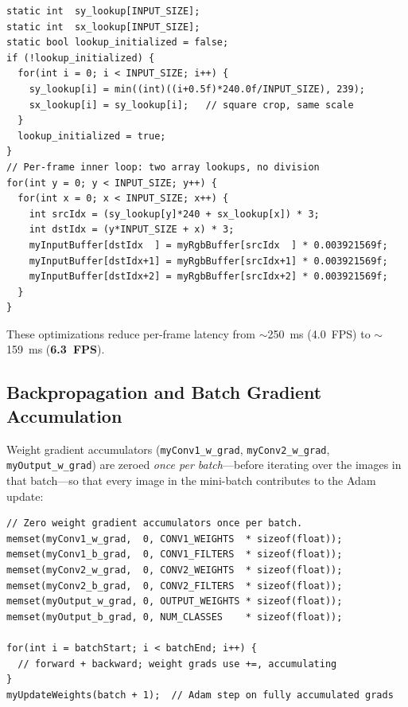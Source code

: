 \documentclass[12pt]{article}
\begin{document}
\begin{lstlisting}[caption={Pre-computed resize lookup tables with multiply-based normalization (Part~3).}]
static int  sy_lookup[INPUT_SIZE];
static int  sx_lookup[INPUT_SIZE];
static bool lookup_initialized = false;
if (!lookup_initialized) {
  for(int i = 0; i < INPUT_SIZE; i++) {
    sy_lookup[i] = min((int)((i+0.5f)*240.0f/INPUT_SIZE), 239);
    sx_lookup[i] = sy_lookup[i];   // square crop, same scale
  }
  lookup_initialized = true;
}
// Per-frame inner loop: two array lookups, no division
for(int y = 0; y < INPUT_SIZE; y++) {
  for(int x = 0; x < INPUT_SIZE; x++) {
    int srcIdx = (sy_lookup[y]*240 + sx_lookup[x]) * 3;
    int dstIdx = (y*INPUT_SIZE + x) * 3;
    myInputBuffer[dstIdx  ] = myRgbBuffer[srcIdx  ] * 0.003921569f;
    myInputBuffer[dstIdx+1] = myRgbBuffer[srcIdx+1] * 0.003921569f;
    myInputBuffer[dstIdx+2] = myRgbBuffer[srcIdx+2] * 0.003921569f;
  }
}
\end{lstlisting}

These optimizations reduce per-frame latency from $\sim$250~ms (4.0~FPS) to
$\sim$159~ms (\textbf{6.3~FPS}).

\subsection{Backpropagation and Batch Gradient Accumulation}
\label{subsec:backprop}

Weight gradient accumulators (\texttt{myConv1\_w\_grad},
\texttt{myConv2\_w\_grad}, \texttt{myOutput\_w\_grad}) are zeroed
\emph{once per batch}---before iterating over the images in that batch---so
that every image in the mini-batch contributes to the Adam update:

\begin{lstlisting}[caption={Batch-level gradient zeroing before Adam update (Part~2).}]
// Zero weight gradient accumulators once per batch.
memset(myConv1_w_grad,  0, CONV1_WEIGHTS  * sizeof(float));
memset(myConv1_b_grad,  0, CONV1_FILTERS  * sizeof(float));
memset(myConv2_w_grad,  0, CONV2_WEIGHTS  * sizeof(float));
memset(myConv2_b_grad,  0, CONV2_FILTERS  * sizeof(float));
memset(myOutput_w_grad, 0, OUTPUT_WEIGHTS * sizeof(float));
memset(myOutput_b_grad, 0, NUM_CLASSES    * sizeof(float));

for(int i = batchStart; i < batchEnd; i++) {
  // forward + backward; weight grads use +=, accumulating
}
myUpdateWeights(batch + 1);  // Adam step on fully accumulated grads
\end{lstlisting}
\end{document}
